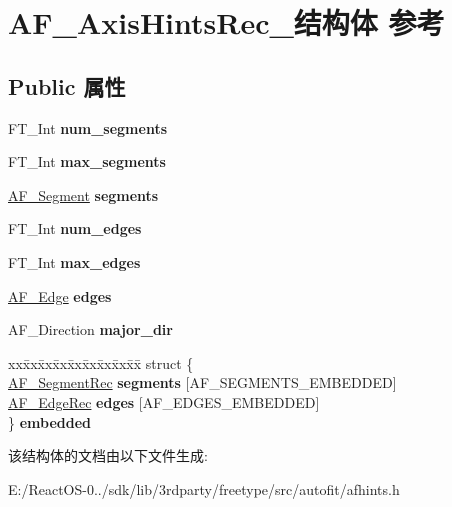 \hypertarget{struct_a_f___axis_hints_rec__}{}\section{A\+F\+\_\+\+Axis\+Hints\+Rec\+\_\+结构体 参考}
\label{struct_a_f___axis_hints_rec__}
\subsection*{Public 属性}
\begin{DoxyCompactItemize}
\item 
\mbox{\label{struct_a_f___axis_hints_rec___a59363b5d4f01b2596971cda9bcc6ba1f}} 
F\+T\+\_\+\+Int {\bfseries num\+\_\+segments}
\item 
\mbox{\label{struct_a_f___axis_hints_rec___a65ce15904dade6d635f667226cba26ae}} 
F\+T\+\_\+\+Int {\bfseries max\+\_\+segments}
\item 
\mbox{\label{struct_a_f___axis_hints_rec___a0af027de055b8d646d0c1c7468c4cb52}} 
\hyperlink{struct_a_f___segment_rec__}{A\+F\+\_\+\+Segment} {\bfseries segments}
\item 
\mbox{\label{struct_a_f___axis_hints_rec___a3313ee61ecfaac9625f5925c79b0a9bb}} 
F\+T\+\_\+\+Int {\bfseries num\+\_\+edges}
\item 
\mbox{\label{struct_a_f___axis_hints_rec___a954d98eda01636812284d10afeecb1c2}} 
F\+T\+\_\+\+Int {\bfseries max\+\_\+edges}
\item 
\mbox{\label{struct_a_f___axis_hints_rec___a4c2d0f3a7406e87957d4a8cbdb9f5d44}} 
\hyperlink{struct_a_f___edge_rec__}{A\+F\+\_\+\+Edge} {\bfseries edges}
\item 
\mbox{\label{struct_a_f___axis_hints_rec___a57536b4d9796707b7580ec00cd34453e}} 
A\+F\+\_\+\+Direction {\bfseries major\+\_\+dir}
\item 
\mbox{\label{struct_a_f___axis_hints_rec___a81d121b678abba9212116767d0947c21}} 
\begin{tabbing}
xx\=xx\=xx\=xx\=xx\=xx\=xx\=xx\=xx\=\kill
struct \{\\
\>\hyperlink{struct_a_f___segment_rec__}{AF\_SegmentRec} {\bfseries segments} \mbox{[}AF\_SEGMENTS\_EMBEDDED\mbox{]}\\
\>\hyperlink{struct_a_f___edge_rec__}{AF\_EdgeRec} {\bfseries edges} \mbox{[}AF\_EDGES\_EMBEDDED\mbox{]}\\
\} {\bfseries embedded}\\

\end{tabbing}\end{DoxyCompactItemize}


该结构体的文档由以下文件生成\+:\begin{DoxyCompactItemize}
\item 
E\+:/\+React\+O\+S-\/0../sdk/lib/3rdparty/freetype/src/autofit/afhints.\+h\end{DoxyCompactItemize}
